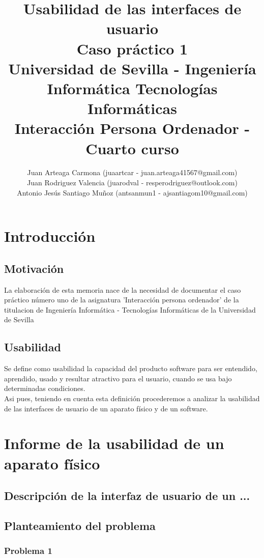\documentclass[a4paper,11pt]{article}
\title{
        \textbf{Usabilidad de las interfaces de usuario}\large\\
        \textbf{Caso práctico 1}\\
        \medskip
        Universidad de Sevilla - Ingeniería Informática Tecnologías Informáticas\\
        Interacción Persona Ordenador - Cuarto curso}
\author{Juan Arteaga Carmona (juaartcar - juan.arteaga41567@gmail.com)\\
        Juan Rodriguez Valencia (juarodval - resperodriguez@outlook.com)\\
        Antonio Jesús Santiago Muñoz (antsanmun1 - ajsantiagom10@gmail.com)\\
}
\begin{document}
\maketitle


\newpage
\tableofcontents
\listoffigures
\renewcommand{\listtablename}{Índice de tablas} %
\listoftables
\newpage

\section{Introducción}
\subsection{Motivación}
La elaboración de esta memoria nace de la necesidad de documentar el caso práctico número uno de la asignatura 'Interacción persona ordenador' de la titulacion de Ingeniería Informática - Tecnologías Informáticas de la Universidad de Sevilla
\subsection{Usabilidad}
Se define como usabilidad la capacidad del producto software para ser entendido, aprendido, usado y resultar atractivo para el usuario, cuando se usa bajo determinadas condiciones. \cite{diapTema1} \cite{iso25010}\\
Asi pues, teniendo en cuenta esta definición procederemos a analizar la usabilidad de las interfaces de usuario de un aparato físico y de un software.

\section{Informe de la usabilidad de un aparato físico}
\subsection{Descripción de la interfaz de usuario de un ... }
\subsection{Planteamiento del problema}
\subsubsection{Problema 1}
\end{document}
